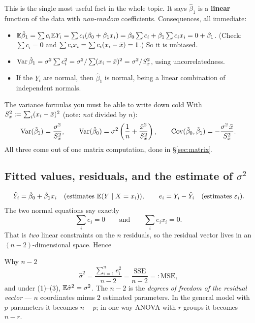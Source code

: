 \documentclass[11pt]{article}
\begin{document}
This is the single most useful fact in the whole topic. It says $\hat\beta_1$ is a
\textbf{linear} function of the data with \emph{non-random} coefficients. Consequences,
all immediate:
\begin{itemize}
  \item $\mathbb{E}\hat\beta_1 = \sum c_i \mathbb{E} Y_i = \sum c_i(\beta_0+\beta_1x_i)
        = \beta_0\sum c_i + \beta_1 \sum c_i x_i = 0 + \beta_1$. (Check:
        $\sum c_i = 0$ and $\sum c_i x_i = \sum c_i(x_i-\bar{x})=1$.) So it is unbiased.
  \item $\operatorname{Var}\hat\beta_1 = \sigma^2\sum c_i^2 = \sigma^2 / \sum(x_i-\bar{x})^2 = \sigma^2/S_x^2$,
        using uncorrelatedness.
  \item If the $Y_i$ are normal, then $\hat\beta_1$ is normal, being a linear combination of
        independent normals.
\end{itemize}

\begin{recipe}{The variance formulas you must be able to write down cold}
With $S_x^2 := \sum_i (x_i-\bar{x})^2$ (note: \emph{not} divided by $n$):
\[
  \operatorname{Var}(\hat\beta_1)=\frac{\sigma^2}{S_x^2},\qquad
  \operatorname{Var}(\hat\beta_0)=\sigma^2\left(\frac1n+\frac{\bar{x}^2}{S_x^2}\right),\qquad
  \operatorname{Cov}(\hat\beta_0,\hat\beta_1)=-\frac{\sigma^2\,\bar{x}}{S_x^2}.
\]
All three come out of one matrix computation, done in \S\ref{sec:matrix}.
\end{recipe}

\subsection{Fitted values, residuals, and the estimate of $\sigma^2$}
\[
  \hat Y_i = \hat\beta_0+\hat\beta_1 x_i \quad(\text{estimates } \mathbb{E}(Y\mid X=x_i)),
  \qquad
  e_i = Y_i - \hat Y_i \quad(\text{estimates } \varepsilon_i).
\]
The two normal equations say exactly
\[
  \sum_i e_i = 0 \qquad\text{and}\qquad \sum_i e_i x_i = 0 .
\]
That is \emph{two} linear constraints on the $n$ residuals, so the residual vector lives in an
$(n-2)$-dimensional space. Hence

\begin{idea}{Why $n-2$}
\[
  \hat\sigma^2 = \frac{\sum_{i=1}^n e_i^2}{n-2} = \frac{\mathrm{SSE}}{n-2} =: \mathrm{MSE},
\]
and under (1)--(3), $\mathbb{E}\hat\sigma^2=\sigma^2$. The $n-2$ is the \emph{degrees of freedom of
the residual vector} --- $n$ coordinates minus $2$ estimated parameters. In the general
model with $p$ parameters it becomes $n-p$; in one-way ANOVA with $r$ groups it becomes
$n-r$.
\end{idea}
\end{document}
